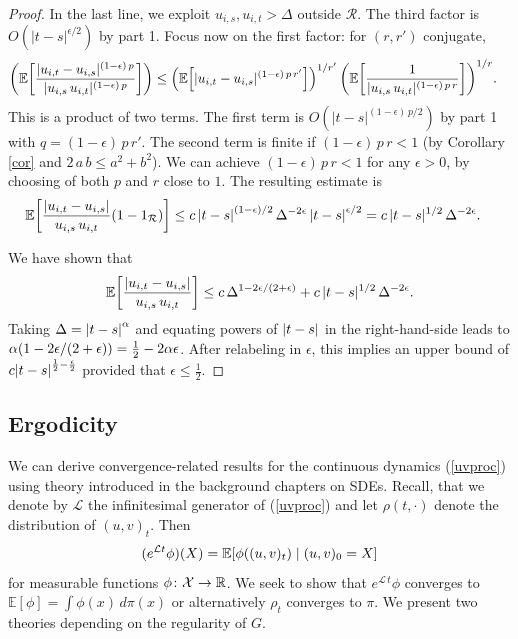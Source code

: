 \documentclass[11pt, twoside]{report}
\begin{document}
\begin{proof}
In the last line, we exploit  $u_{i,s},u_{i,t}>\Delta$ outside $\mathcal R$.
The third factor is $O(|t-s|^{\epsilon/2})$ by part 1.
    Focus now on the first factor: for $(r,r')$ conjugate,
\begin{align*}
&\pp{\mathbb{E} \bp{\frac {|u_{i,t}-u_{i,s}|^{(1-\epsilon)\,p}}{|u_{i,s}\,u_{i,t}|^{(1-\epsilon)\,p}}}}
\le \pp{\mathbb{E} \bp{ {|u_{i,t}-u_{i,s}|^{(1-\epsilon)\,p\,r'}}}}^{1/r'}\, \pp{\mathbb{E} \bp{\frac {1}{|u_{i,s}\,u_{i,t}|^{(1-\epsilon)\,p \,r}}}}^{1/r}.
\end{align*}
This is a product of two terms. The first term is $O(|t-s|^{(1-\epsilon)\,p/2})$ by part 1 with  $q=(1-\epsilon)\,p\, r'$.
   The second term is finite if $(1-\epsilon) \,p\, r<1$ (by Corollary \ref{cor} and $2\,a\,b\le a^2+b^2$).
We can achieve $(1-\epsilon)\,p\,r<1$ for any $\epsilon>0$, by choosing of both $p$ and $r$ close to $1$. The resulting estimate is
 \begin{align}\label{temporary}
  \mathbb{E} \bp{\frac {|u_{i,t}-u_{i,s}|}{u_{i,s}\,u_{i,t}} (1-1_{\mathcal R})}
 &\le c\, \abs{t-s}^{(1-\epsilon)/2}\, \Delta ^{-2\epsilon}\, \abs{t-s}^{\epsilon/2}
 = c\,|t-s|^{1/2}\, \Delta^{-2\epsilon}.
 \end{align}

    We have shown that 
       \begin{align}\label{combined_estimate}
       \mathbb{E} \bp{\frac {|u_{i,t}-u_{i,s}|}{u_{i,s}\,u_{i,t}}} 
     \le  c \,\Delta^{1-2\epsilon/(2+\epsilon)}
     +c\,|t-s|^{1/2} \,\Delta^{-2\epsilon}.
     \end{align}
     Taking $\Delta = \left\lvert t-s\right\rvert^\alpha$ and equating powers of $\left\lvert t-s\right\rvert$ in the right-hand-side
     leads to $\alpha\pa{1-2\epsilon/(2+\epsilon)} = \frac12 - 2\alpha \epsilon$. After relabeling in $\epsilon$, this implies an upper bound of $c \abs{t-s}^{\frac12 - \frac{\epsilon}{2}}$ provided that $\epsilon \leq \frac12$. 
\end{proof}

\subsection{Ergodicity}
We can derive convergence-related results for the continuous dynamics (\ref{uvproc}) using theory introduced in the background chapters on SDEs. Recall, that we denote by $\mathcal L$ the infinitesimal generator of (\ref{uvproc}) and let $\rho(t,\cdot)$ denote the distribution of $(u,v)_t$.
Then \[(e^{\mathcal L  t}\phi)(X)=\mean{\phi((u,v)
_t) \mid (u,v)_0=X}\] for measurable functions $\phi\colon \mathcal X\to\mathbb{R}$. We seek to show 
that $e^{\mathcal L \,t }\phi$ converges to $\mathbb{E}[\phi]=\int \phi(x)\,d\pi(x)$ or alternatively $\rho_t$ converges to $\pi$. We present two theories depending on the regularity of $G$.
\end{document}
